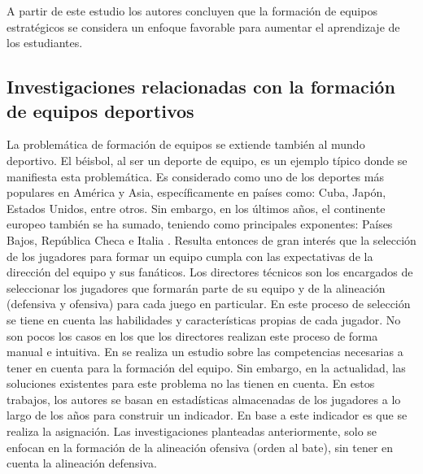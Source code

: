A partir de este estudio los autores concluyen que la formación de equipos estratégicos se considera un enfoque favorable para aumentar el aprendizaje de los estudiantes.

\subsection{Investigaciones relacionadas con la formación de equipos deportivos}

La problemática de formación de equipos se extiende también al mundo deportivo. El béisbol, al ser un deporte de equipo, es un ejemplo típico donde se manifiesta esta problemática. Es considerado como uno de los deportes más populares en América y Asia, específicamente en países como: Cuba, Japón, Estados Unidos, entre otros. Sin embargo, en los últimos años, el continente europeo también se ha sumado, teniendo como principales exponentes: Países Bajos, República Checa e Italia \cite{WBSC2021}. Resulta entonces de gran interés que la selección de los jugadores para formar un equipo cumpla con las expectativas de la dirección del equipo y sus fanáticos. Los directores técnicos son los encargados de seleccionar los jugadores que formarán parte de su equipo y de la alineación (defensiva y ofensiva) para cada juego en particular. En este proceso de selección se tiene en cuenta las habilidades y características propias de cada jugador. No son pocos los casos en los que los directores realizan este proceso de forma manual e intuitiva. En \cite{Smith1995} se realiza un estudio sobre las competencias necesarias a tener en cuenta para la formación del equipo. Sin embargo, en la actualidad, las soluciones existentes para este problema \citep{Polyashuk2015, Sugrue2007} no las tienen en cuenta. En estos trabajos, los autores se basan en estadísticas almacenadas de los jugadores a lo largo de los años para construir un indicador. En base a este indicador es que se realiza la asignación. Las investigaciones planteadas anteriormente, solo se enfocan en la formación de la alineación ofensiva (orden al bate), sin tener en cuenta la alineación defensiva.\\

